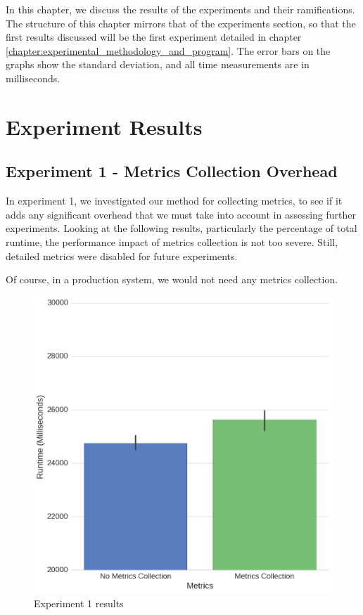 
In this chapter, we discuss the results of the experiments and their ramifications. The structure of this chapter mirrors that of the experiments section, so that the first results discussed will be the first experiment detailed in chapter \ref{chapter:experimental_methodology_and_program}. The error bars on the graphs show the standard deviation, and all time measurements are in milliseconds.



\section{Experiment Results}



\subsection{Experiment 1 - Metrics Collection Overhead}

In experiment 1, we investigated our method for collecting metrics, to see if it adds any significant overhead that we must take into account in assessing further experiments. Looking at the following results, particularly the percentage of total runtime, the performance impact of metrics collection is not too severe. Still, detailed metrics were disabled for future experiments.

Of course, in a production system, we would not need any metrics collection.


\begin{figure}[H]
	\centering
	\includegraphics[width=\textwidth]{graphics/experiment1.png}
	\caption{Experiment 1 results}
	\label{fig:results_ex1}
\end{figure}


